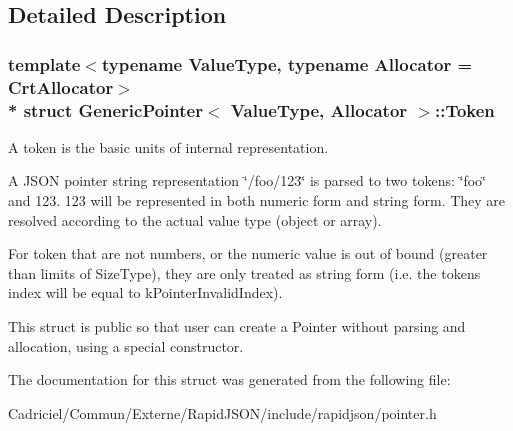 \subsection{Detailed Description}
\subsubsection*{template$<$typename Value\+Type, typename Allocator = Crt\+Allocator$>$\\*
struct Generic\+Pointer$<$ Value\+Type, Allocator $>$\+::\+Token}

A token is the basic units of internal representation. 

A J\+S\+ON pointer string representation \char`\"{}/foo/123\char`\"{} is parsed to two tokens\+: \char`\"{}foo\char`\"{} and 123. 123 will be represented in both numeric form and string form. They are resolved according to the actual value type (object or array).

For token that are not numbers, or the numeric value is out of bound (greater than limits of Size\+Type), they are only treated as string form (i.\+e. the token\textquotesingle{}s index will be equal to k\+Pointer\+Invalid\+Index).

This struct is public so that user can create a Pointer without parsing and allocation, using a special constructor. 

The documentation for this struct was generated from the following file\+:\begin{DoxyCompactItemize}
\item 
Cadriciel/\+Commun/\+Externe/\+Rapid\+J\+S\+O\+N/include/rapidjson/pointer.\+h\end{DoxyCompactItemize}
